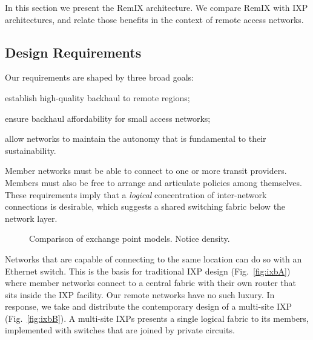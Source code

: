 In this section we present the RemIX architecture. We compare RemIX with IXP architectures, and relate those
benefits in the context of remote access networks.

\subsection{Design Requirements}

Our requirements are shaped by three broad goals:
\begin{inparaenum}[(i)]
  \item establish high-quality backhaul to remote regions;
  \item ensure backhaul affordability for small access networks;
  \item allow networks to maintain the autonomy that is
    fundamental to their sustainability.
\end{inparaenum}
Member networks must be able to connect to one or more transit providers.
Members must also be free to arrange and articulate policies among themselves.
These requirements imply that a \emph{logical} concentration of inter-network
connections is desirable, which suggests a shared switching fabric below the
network layer.

\begin{figure*}
   \hfill
   \hfill
  \subfloat[RemIX]{
    \resizebox{0.6\columnwidth}{!}{
      \begin{tikzpicture}
        \ixboxesC
      \end{tikzpicture}
      \label{fig:ixbC}
    }
  }
  \caption{Comparison of exchange point models. Notice density.}
  \label{fig:ixb}
\end{figure*}

Networks that are capable of connecting to the same location can do so with an
Ethernet switch. This is the basis for traditional \ac{IXP} design (Fig.~\ref{fig:ixbA}) where member networks connect to a central fabric
with their own router that sits inside the IXP facility. Our remote networks
have no such luxury. In response, we take and distribute the contemporary design
of a multi-site \ac{IXP} (Fig.~\ref{fig:ixbB}). A multi-site \acp{IXP}
presents a single logical fabric to its members, implemented with switches
that are joined by private circuits.

